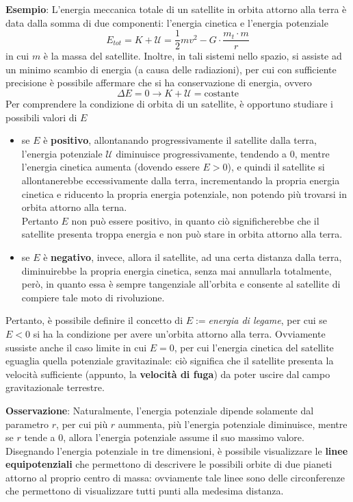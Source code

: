 \documentclass[a4paper]{extarticle}
\begin{document}
\vspace{1em}
\noindent
\textbf{Esempio}: L'energia meccanica totale di un satellite in orbita attorno alla terra è data dalla somma di due componenti: l'energia cinetica e l'energia potenziale
\[E_{tot} = K+\mathcal{U}=\frac{1}{2}mv^2 - G \cdot \frac{m_t \cdot m}{r}\]
in cui $m$ è la massa del satellite. Inoltre, in tali sistemi nello spazio, si assiste ad un minimo scambio di energia (a causa delle radiazioni), per cui con sufficiente precisione è possibile affermare che si ha conservazione di energia, ovvero
\[\Delta E = 0 \longrightarrow K+\mathcal{U}=\text{costante}\]
Per comprendere la condizione di orbita di un satellite, è opportuno studiare i possibili valori di $E$
\begin{itemize}
  \item se $E$ è \textbf{positivo}, allontanando progressivamente il satellite dalla terra, l'energia potenziale $\mathcal{U}$ diminuisce progressivamente, tendendo a $0$, mentre l'energia cinetica aumenta (dovendo essere $E>0$), e quindi il satellite si allontanerebbe eccessivamente dalla terra, incrementando la propria energia cinetica e riducento la propria energia potenziale, non potendo più trovarsi in orbita attorno alla terna.\\
  Pertanto $E$ non può essere positivo, in quanto ciò significherebbe che il satellite presenta troppa energia e non può stare in orbita attorno alla terra.
  \item se $E$ è \textbf{negativo}, invece, allora il satellite, ad una certa distanza dalla terra, diminuirebbe la propria energia cinetica, senza mai annullarla totalmente, però, in quanto essa è sempre tangenziale all'orbita e consente al satellite di compiere tale moto di rivoluzione.
\end{itemize}
Pertanto, è possibile definire il concetto di \emph{$E:=$energia di legame}, per cui se $E < 0$ si ha la condizione per avere un'orbita attorno alla terra. Ovviamente sussiste anche il caso limite in cui $E=0$, per cui l'energia cinetica del satellite eguaglia quella potenziale gravitazinale: ciò significa che il satellite presenta la velocità sufficiente (appunto, la \textbf{velocità di fuga}) da poter uscire dal campo gravitazionale terrestre.

\vspace{1em}
\noindent
\textbf{Osservazione}: Naturalmente, l'energia potenziale dipende solamente dal parametro $r$, per cui più $r$ aummenta, più l'energia potenziale diminuisce, mentre se $r$ tende a $0$, allora l'energia potenziale assume il suo massimo valore.\\
Disegnando l'energia potenziale in tre dimensioni, è possibile visualizzare le \textbf{linee equipotenziali} che permettono di descrivere le possibili orbite di due pianeti attorno al proprio centro di massa: ovviamente tale linee sono delle circonferenze che permettono di visualizzare tutti punti alla medesima distanza.
\end{document}
